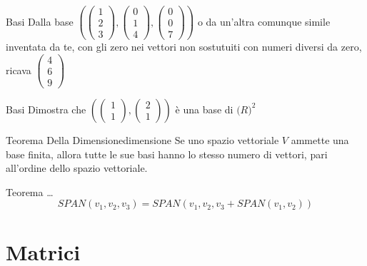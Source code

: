 \documentclass{article}
\begin{document}
\begin{exercise}{Basi}{}
    Dalla base $(\begin{pmatrix}
            1 \\
            2 \\
            3
            \end{pmatrix}, \begin{pmatrix}
            0 \\
            1 \\
            4
            \end{pmatrix}, \begin{pmatrix}
            0 \\
            0 \\
            7
            \end{pmatrix})$ o da un'altra comunque simile inventata da te, con gli zero nei vettori non sostutuiti con numeri diversi da zero, ricava $\begin{pmatrix}
            4 \\
            6 \\
            9
            \end{pmatrix}$
\end{exercise}

\begin{exercise}{Basi}{}
    Dimostra che
    $(\begin{pmatrix}
        1 \\
        1 
    \end{pmatrix}, \begin{pmatrix}
        2 \\
        1 
    \end{pmatrix})$ è una base di $\mathbb(R)^2$
\end{exercise}

\begin{exercise}{Teorema Della Dimensione}{dimensione}
    Se uno spazio vettoriale $V$ ammette una base finita, allora tutte le sue basi hanno lo stesso numero di vettori, pari all'ordine dello spazio vettoriale.
\end{exercise}

\begin{theorem}{Teorema \dots}{}
    \[SPAN(v_1, v_2, v_3) = SPAN(v_1, v_2, v_3 + SPAN(v_1, v_2))\]  
\end{theorem}

\section{Matrici}
\end{document}
